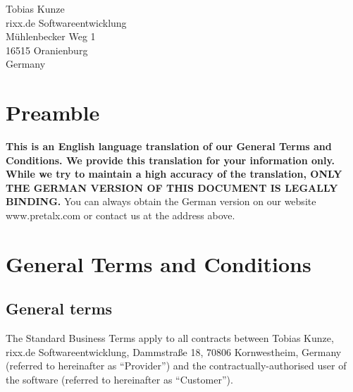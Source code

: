 \documentclass{terms}
\begin{document}
\maketitle

\begin{center}
Tobias Kunze\\
rixx.de Softwareentwicklung\\
Mühlenbecker Weg 1\\
16515 Oranienburg\\
Germany
\end{center}
\sloppy

\section*{Preamble}

\textbf{This is an English language translation of our General Terms and Conditions.
We provide this translation for your information only.
While we try to maintain a high accuracy of the translation, ONLY THE GERMAN VERSION OF THIS DOCUMENT IS LEGALLY BINDING.}
You can always obtain the German version on our website www.pretalx.com or contact us at the address above.

\section{General Terms and Conditions}
\subsection{General terms}
The Standard Business Terms apply to all contracts between Tobias Kunze, rixx.de Softwareentwicklung, Dammstraße 18, 70806 Kornwestheim, Germany (referred to hereinafter as “Provider”) and the contractually-authorised user of the software (referred to hereinafter as “Customer”).
\end{document}
